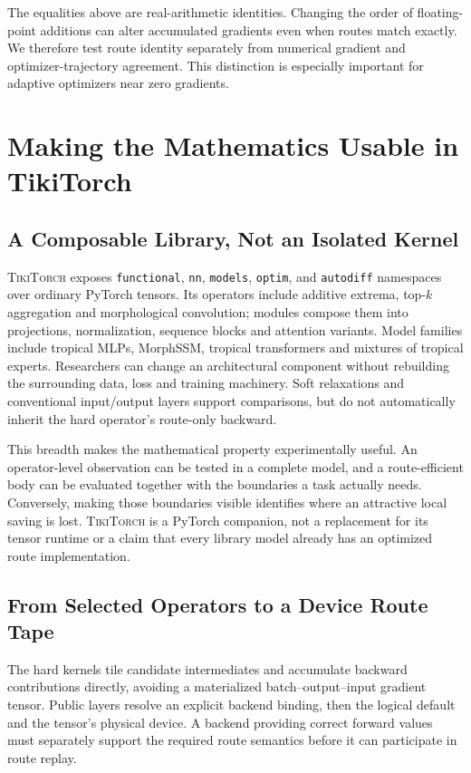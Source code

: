 \documentclass{article}
\theoremstyle{plain}
\theoremstyle{definition}
\theoremstyle{remark}
\newcommand{\ttorch}{\textsc{TikiTorch}}
\newcommand{\code}[1]{\texttt{#1}}
\begin{document}
The equalities above are real-arithmetic identities. Changing the order of
floating-point additions can alter accumulated gradients even when routes
match exactly. We therefore test route identity separately from numerical
gradient and optimizer-trajectory agreement. This distinction is especially
important for adaptive optimizers near zero gradients.

\section{Making the Mathematics Usable in TikiTorch}
\label{sec:implementation}

\subsection{A Composable Library, Not an Isolated Kernel}

\ttorch{} exposes \code{functional}, \code{nn}, \code{models},
\code{optim}, and \code{autodiff} namespaces over ordinary PyTorch tensors.
Its operators include additive extrema, top-$k$ aggregation and
morphological convolution; modules compose them into projections,
normalization, sequence blocks and attention variants. Model families
include tropical MLPs, MorphSSM, tropical transformers and mixtures of
tropical experts. Researchers can change an architectural component
without rebuilding the surrounding data, loss and training machinery.
Soft relaxations and conventional input/output layers support comparisons,
but do not automatically inherit the hard operator's route-only backward.

This breadth makes the mathematical property experimentally useful.
An operator-level observation can be tested in a complete model, and a
route-efficient body can be evaluated together with the boundaries a task
actually needs. Conversely, making those boundaries visible identifies
where an attractive local saving is lost. \ttorch{} is a PyTorch companion,
not a replacement for its tensor runtime or a claim that every library
model already has an optimized route implementation.

\subsection{From Selected Operators to a Device Route Tape}

The hard kernels tile candidate intermediates and accumulate backward
contributions directly, avoiding a materialized batch--output--input
gradient tensor. Public layers resolve an explicit backend binding, then
the logical default and the tensor's physical device. A backend providing
correct forward values must separately support the required route semantics
before it can participate in route replay.
\end{document}
